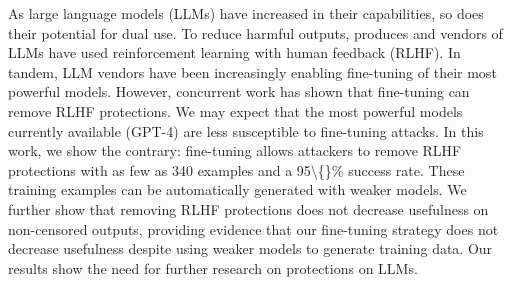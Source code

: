 As large language models (LLMs) have increased in their capabilities, so does their potential for dual use. To reduce harmful outputs, produces and vendors of LLMs have used reinforcement learning with human feedback (RLHF). In tandem, LLM vendors have been increasingly enabling fine-tuning of their most powerful models. However, concurrent work has shown that fine-tuning can remove RLHF protections. We may expect that the most powerful models currently available (GPT-4) are less susceptible to fine-tuning attacks.  In this work, we show the contrary: fine-tuning allows attackers to remove RLHF protections with as few as 340 examples and a 95\textbackslash\{\}\% success rate. These training examples can be automatically generated with weaker models. We further show that removing RLHF protections does not decrease usefulness on non-censored outputs, providing evidence that our fine-tuning strategy does not decrease usefulness despite using weaker models to generate training data. Our results show the need for further research on protections on LLMs.